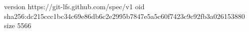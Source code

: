 version https://git-lfs.github.com/spec/v1
oid sha256:dc215ccc1bc34c69e86db6c2e2995b7847e5a5c60f7423c9c92fb3a026153880
size 5566
